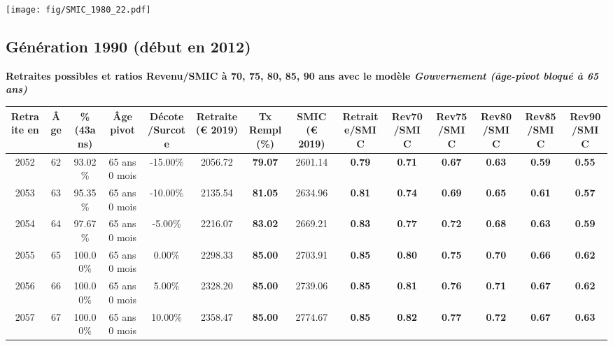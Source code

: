  \vspace{0.1cm} 

 \begin{center}\texttt{[image: fig/SMIC\_1980\_22.pdf]}\end{center} \label{fig/SMIC_1980_22.pdf} 

\newpage 
 
\subsection{Génération 1990 (début en 2012)} 

{\bf \noindent Retraites possibles et ratios Revenu/SMIC à 70, 75, 80, 85, 90 ans avec le modèle \emph{Gouvernement (âge-pivot bloqué à 65 ans)}}  
 
\begin{adjustbox}{max width=\textwidth} 
\begin{tabular}[htb]{|c|c||c|c|c||c|c||c||c|c|c|c|c|c|} 
\hline 
 Retraite en &  Âge &  \%(43ans) &  Âge pivot &  Décote/Surcote &  Retraite (\euro{} 2019) &  Tx Rempl(\%) &  SMIC (\euro{} 2019) &  Retraite/SMIC &  Rev70/SMIC &  Rev75/SMIC &  Rev80/SMIC &  Rev85/SMIC &  Rev90/SMIC \\ 
\hline \hline 
 2052 &  62 &  93.02\% &  65 ans 0 mois &  -15.00\% &  2056.72 &  {\bf 79.07} &  2601.14 &  {\bf {\color{red} 0.79}} &  {\bf {\color{red} 0.71}} &  {\bf {\color{red} 0.67}} &  {\bf {\color{red} 0.63}} &  {\bf {\color{red} 0.59}} &  {\bf {\color{red} 0.55}} \\ 
\hline 
 2053 &  63 &  95.35\% &  65 ans 0 mois &  -10.00\% &  2135.54 &  {\bf 81.05} &  2634.96 &  {\bf {\color{red} 0.81}} &  {\bf {\color{red} 0.74}} &  {\bf {\color{red} 0.69}} &  {\bf {\color{red} 0.65}} &  {\bf {\color{red} 0.61}} &  {\bf {\color{red} 0.57}} \\ 
\hline 
 2054 &  64 &  97.67\% &  65 ans 0 mois &  -5.00\% &  2216.07 &  {\bf 83.02} &  2669.21 &  {\bf {\color{red} 0.83}} &  {\bf {\color{red} 0.77}} &  {\bf {\color{red} 0.72}} &  {\bf {\color{red} 0.68}} &  {\bf {\color{red} 0.63}} &  {\bf {\color{red} 0.59}} \\ 
\hline 
 2055 &  65 &  100.00\% &  65 ans 0 mois &  0.00\% &  2298.33 &  {\bf 85.00} &  2703.91 &  {\bf {\color{red} 0.85}} &  {\bf {\color{red} 0.80}} &  {\bf {\color{red} 0.75}} &  {\bf {\color{red} 0.70}} &  {\bf {\color{red} 0.66}} &  {\bf {\color{red} 0.62}} \\ 
\hline 
 2056 &  66 &  100.00\% &  65 ans 0 mois &  5.00\% &  2328.20 &  {\bf 85.00} &  2739.06 &  {\bf {\color{red} 0.85}} &  {\bf {\color{red} 0.81}} &  {\bf {\color{red} 0.76}} &  {\bf {\color{red} 0.71}} &  {\bf {\color{red} 0.67}} &  {\bf {\color{red} 0.62}} \\ 
\hline 
 2057 &  67 &  100.00\% &  65 ans 0 mois &  10.00\% &  2358.47 &  {\bf 85.00} &  2774.67 &  {\bf {\color{red} 0.85}} &  {\bf {\color{red} 0.82}} &  {\bf {\color{red} 0.77}} &  {\bf {\color{red} 0.72}} &  {\bf {\color{red} 0.67}} &  {\bf {\color{red} 0.63}} \\ 
\hline 
\hline 
\end{tabular} 
\end{adjustbox} 
 

